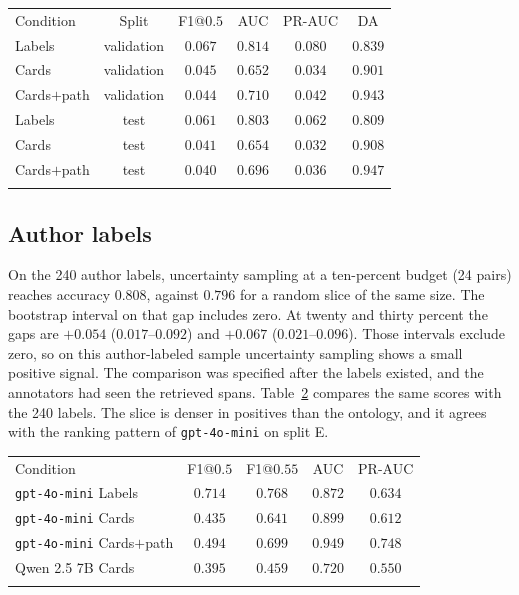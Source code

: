 \documentclass{ws-ijait}
\begin{document}
\begin{table}[th]
{\begin{tabular}{@{}lccccc@{}}
\toprule
Condition & Split & F1@$0.5$ & {AUC} & {PR}-{AUC} & {DA} \\
\colrule
Labels & validation & $0.067$ & $\mathbf{0.814}$ & $\mathbf{0.080}$ & $0.839$ \\
Cards & validation & $0.045$ & $0.652$ & $0.034$ & $0.901$ \\
Cards$+$path & validation & $0.044$ & $0.710$ & $0.042$ & $\mathbf{0.943}$ \\
Labels & test & $\mathbf{0.061}$ & $\mathbf{0.803}$ & $\mathbf{0.062}$ & $0.809$ \\
Cards & test & $0.041$ & $0.654$ & $0.032$ & $0.908$ \\
Cards$+$path & test & $0.040$ & $0.696$ & $0.036$ & $\mathbf{0.947}$ \\
\botrule
\end{tabular}}
\label{tab:qwen}
\end{table}

\subsection{Author labels}
On the 240 author labels, uncertainty sampling at a ten-percent
budget (24 pairs) reaches accuracy $0.808$, against $0.796$ for a
random slice of the same size.
The bootstrap interval on that gap includes zero.
At twenty and thirty percent the gaps are $+0.054$
($0.017$--$0.092$) and $+0.067$ ($0.021$--$0.096$).
Those intervals exclude zero, so on this author-labeled sample
uncertainty sampling shows a small positive signal.
The comparison was specified after the labels existed, and the
annotators had seen the retrieved spans.
Table~\ref{tab:human} compares the same scores with the 240 labels.
The slice is denser in positives than the ontology, and it agrees
with the ranking pattern of \texttt{gpt-4o-mini} on split E.

\begin{table}[th]
{\begin{tabular}{@{}lcccc@{}}
\toprule
Condition & F1@$0.5$ & F1@$0.55$ & {AUC} & {PR}-{AUC} \\
\colrule
\texttt{gpt-4o-mini} Labels & $\mathbf{0.714}$ & $\mathbf{0.768}$ & $0.872$ & $0.634$ \\
\texttt{gpt-4o-mini} Cards & $0.435$ & $0.641$ & $0.899$ & $0.612$ \\
\texttt{gpt-4o-mini} Cards$+$path & $0.494$ & $0.699$ & $\mathbf{0.949}$ & $\mathbf{0.748}$ \\
{Qwen} 2.5 7B Cards & $0.395$ & $0.459$ & $0.720$ & $0.550$ \\
\botrule
\end{tabular}}
\label{tab:human}
\end{table}
\end{document}
